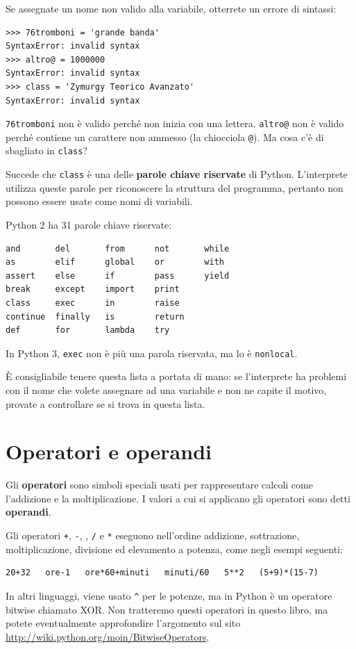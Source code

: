 \documentclass[10pt]{book}
\begin{document}
Se assegnate un nome non valido alla variabile, otterrete un errore di sintassi:

\begin{verbatim}
>>> 76tromboni = 'grande banda'
SyntaxError: invalid syntax
>>> altro@ = 1000000
SyntaxError: invalid syntax
>>> class = 'Zymurgy Teorico Avanzato'
SyntaxError: invalid syntax
\end{verbatim}
%
{\tt 76tromboni} non è valido perché non inizia con una lettera.
{\tt altro@} non è valido perché contiene un carattere non ammesso (la chiocciola {\tt @}). Ma cosa c'è di sbagliato in {\tt class}?

Succede che {\tt class} è una delle {\bf parole chiave riservate} di Python. L'interprete utilizza queste parole per riconoscere la struttura del programma, pertanto non possono essere usate come nomi di variabili.

Python 2 ha 31 parole chiave riservate:

\begin{verbatim}
and       del       from      not       while    
as        elif      global    or        with     
assert    else      if        pass      yield    
break     except    import    print              
class     exec      in        raise              
continue  finally   is        return             
def       for       lambda    try
\end{verbatim}
%
In Python 3, {\tt exec} non è più una parola riservata, ma lo è {\tt nonlocal}.

È consigliabile tenere questa lista a portata di mano: se l'interprete ha problemi con il nome che volete assegnare ad una variabile e non ne capite il motivo, provate a controllare se si trova in questa lista.


\section{Operatori e operandi}

Gli {\bf operatori} sono simboli speciali usati per rappresentare calcoli come l'addizione e la moltiplicazione. I valori a cui si applicano gli operatori sono detti {\bf operandi}.

Gli operatori {\tt +}, {\tt -}, {\tt *}, {\tt /} e {\tt **}
eseguono nell'ordine addizione, sottrazione, moltiplicazione, divisione ed elevamento a potenza, come negli esempi seguenti:

\begin{verbatim}
20+32   ore-1   ore*60+minuti   minuti/60   5**2   (5+9)*(15-7)
\end{verbatim}
%
In altri linguaggi, viene usato \verb"^" per le potenze, ma in Python è un operatore bitwise chiamato XOR. Non tratteremo questi operatori in questo libro, ma potete eventualmente approfondire l'argomento sul sito \url{http://wiki.python.org/moin/BitwiseOperators}.
\end{document}

